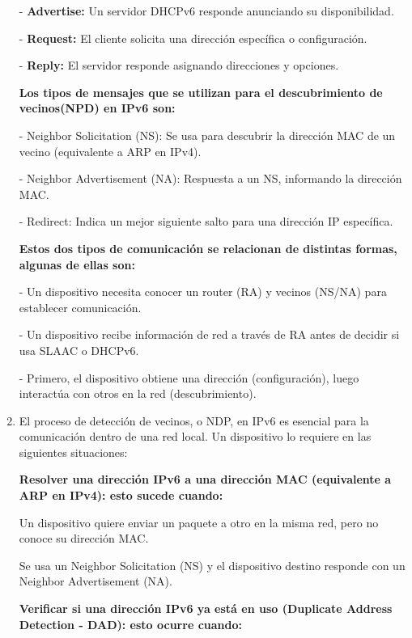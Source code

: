 \documentclass[12pt]{article}
\begin{document}
\begin{enumerate}
\begin{center}
 	-	\textbf{Advertise:} Un servidor DHCPv6 responde anunciando su disponibilidad.
 	
 	-	\textbf{Request:} El cliente solicita una dirección específica o configuración.
 	
 	-	\textbf{Reply:} El servidor responde asignando direcciones y opciones.
 \end{center}
 
\textbf{ Los tipos de mensajes que se utilizan para el descubrimiento de vecinos(NPD) en IPv6 son:}
 
 	\begin{center}
 		-	Neighbor Solicitation (NS): Se usa para descubrir la dirección MAC de un vecino (equivalente a ARP en IPv4).
 	
 	
 	-	Neighbor Advertisement (NA): Respuesta a un NS, informando la dirección MAC.
 	
 	
 	-	Redirect: Indica un mejor siguiente salto para una dirección IP específica.
 	\end{center}
 	
 	\textbf{Estos dos tipos de comunicación se relacionan de distintas formas, algunas de ellas son:}
 	
 	-	Un dispositivo necesita conocer un router (RA) y vecinos (NS/NA) para establecer comunicación.
 		
 		
 	-	Un dispositivo recibe información de red a través de RA antes de decidir si usa SLAAC o DHCPv6.
 	
 	-	Primero, el dispositivo obtiene una dirección (configuración), luego interactúa con otros en la red (descubrimiento).
 		
 	\item El proceso de detección de vecinos, o NDP, en IPv6 es esencial para la comunicación dentro de una red local. Un dispositivo lo requiere en las siguientes situaciones:
 	 
 	\textbf{Resolver una dirección IPv6 a una dirección MAC (equivalente a ARP en IPv4): esto sucede cuando:}
 	
 	\hspace{2cm}Un dispositivo quiere enviar un paquete a otro en la misma red, pero no conoce su dirección MAC.
 	
 	\hspace{2cm}Se usa un Neighbor Solicitation (NS) y el dispositivo destino responde con un Neighbor Advertisement (NA).
 	
 	\textbf{Verificar si una dirección IPv6 ya está en uso (Duplicate Address Detection - DAD): esto ocurre cuando:}
 	

\end{enumerate}
\end{document}
